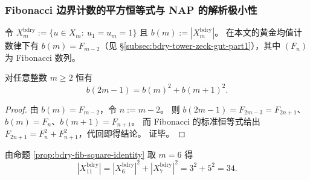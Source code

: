 \subsubsection{Fibonacci 边界计数的平方恒等式与 NAP 的解析极小性}\label{subsubsec:bdry-fib-square-identities-nap-minimality}

令 \(X_m^{\mathrm{bdry}}:=\{u\in X_m:\ u_1=u_m=1\}\) 且 \(b(m):=|X_m^{\mathrm{bdry}}|\)。
在本文的黄金均值计数律下有 \(b(m)=F_{m-2}\)（见 \S\ref{subsec:bdry-tower-zeck-gut-part1}），其中 \((F_n)\) 为 Fibonacci 数列。

\begin{proposition}\label{prop:bdry-fib-square-identity}
对任意整数 \(m\ge 2\) 恒有
\[
b(2m-1)=b(m)^2+b(m+1)^2.
\]
\end{proposition}
\begin{proof}
由 \(b(m)=F_{m-2}\)，令 \(n:=m-2\)。
则 \(b(2m-1)=F_{2m-3}=F_{2n+1}\)、\(b(m)=F_n\)、\(b(m+1)=F_{n+1}\)。
而 Fibonacci 的标准恒等式给出
\(
F_{2n+1}=F_n^2+F_{n+1}^2
\)，代回即得结论。
证毕。
\end{proof}

\begin{corollary}[数值实例：\(m=6\) 的边界层]\label{cor:bdry-m6-square-instance}
由命题 \ref{prop:bdry-fib-square-identity} 取 \(m=6\) 得
\[
|X_{11}^{\mathrm{bdry}}|=|X_{6}^{\mathrm{bdry}}|^2+|X_{7}^{\mathrm{bdry}}|^2=3^2+5^2=34.
\]
\end{corollary}

